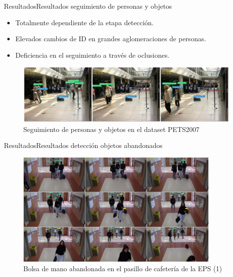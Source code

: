 \begin{frame}{Resultados}{Resultados seguimiento de personas y objetos}

\begin{itemize}
    \justifying
    \item Totalmente dependiente de la etapa detección.
    \item Elevados cambios de ID en grandes aglomeraciones de personas.
    \item Deficiencia en el seguimiento a través de oclusiones.
\end{itemize}

\begin{figure}[ht]
\centering
\includegraphics[width=1\textwidth]{Images/resultados/evaluacion-algoritmos/pets-tracking-result-example.jpg}
\caption{\label{fig:pets-tracking-result-example}Seguimiento de personas y objetos en el dataset PETS2007}
\end{figure}

\end{frame}


\begin{frame}{Resultados}{Resultados detección objetos abandonados}

\begin{figure}[ht]
\centering
\includegraphics[width=0.9\textwidth]{Images/resultados/evaluacion-algoritmos/1.png}
\caption{\label{fig:abandono-uah1}Bolsa de mano abandonada en el pasillo de cafetería de la EPS (1)}
\end{figure}

\end{frame}

